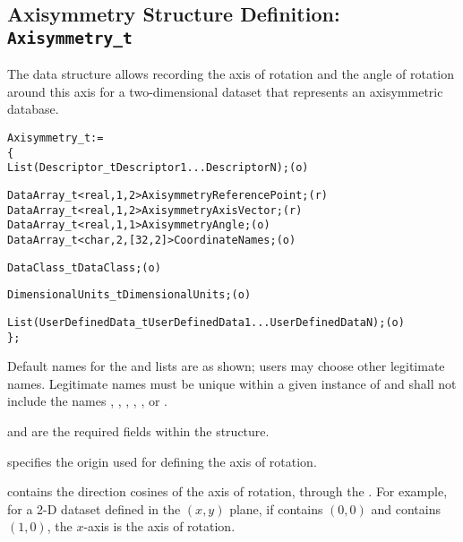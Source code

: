 \subsection{Axisymmetry Structure Definition: \texttt{Axisymmetry\_t}}
\label{s:Axisymmetry}

The  data structure allows recording the axis of
rotation and the angle of rotation around this axis for a two-dimensional
dataset that represents an axisymmetric database.

\begin{alltt}
  Axisymmetry\_t :=
    \{
    List( Descriptor\_t Descriptor1 ... DescriptorN ) ;                      (o)

    DataArray\_t<real,1,2> AxisymmetryReferencePoint ;                       (r)
    DataArray\_t<real,1,2> AxisymmetryAxisVector ;                           (r)
    DataArray\_t<real,1,1> AxisymmetryAngle ;                                (o)
    DataArray\_t<char,2,[32,2]> CoordinateNames ;                            (o)

    DataClass\_t DataClass ;                                                 (o)

    DimensionalUnits\_t DimensionalUnits ;                                   (o)

    List( UserDefinedData\_t UserDefinedData1 ... UserDefinedDataN ) ;       (o)
    \} ;
\end{alltt}

\begin{notes}
\item Default names for the  and
       lists are as shown; users may choose
      other legitimate names.
      Legitimate names must be unique within a given instance
      of  and shall not include the names
      , ,
      , ,
      , or .
\item {} and 
      are the required fields within the  structure.
\end{notes}

 specifies the origin used for
defining the axis of rotation.

 contains the direction cosines of the
axis of rotation, through the .
For example, for a 2-D dataset defined in the $(x,y)$ plane,
if  contains $(0,0)$ and
 contains $(1,0)$, the $x$-axis is the
axis of rotation.

